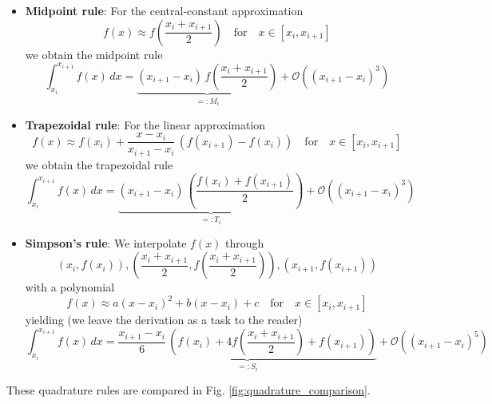 \begin{itemize}
    \item \textbf{Midpoint rule}: For the central-constant approximation
    \begin{equation}
        f(x) \approx f\left( \frac{x_{i} + x_{i+1}}{2} \right) \quad \text{for} \quad x \in [x_i, x_{i+1}]
    \end{equation}
    we obtain the midpoint rule
    \begin{equation}
        \int_{x_i}^{x_{i+1}} f(x) \, dx = \underbrace{(x_{i+1} - x_i) \, f\left( \frac{x_{i} + x_{i+1}}{2} \right)}_{=:M_i} + \mathcal{O}((x_{i+1} - x_i)^3)
    \end{equation}
    \item \textbf{Trapezoidal rule}: For the linear approximation
    \begin{equation}
        f(x) \approx f\left( x_{i} \right) + \frac{x-x_{i}}{x_{i+1}-x_{i}} \, \left( f\left( x_{i+1} \right) - f\left( x_{i} \right) \right) \quad \text{for} \quad x \in [x_i, x_{i+1}]
    \end{equation}
    we obtain the trapezoidal rule
    \begin{equation}
        \int_{x_i}^{x_{i+1}} f(x) \, dx = \underbrace{(x_{i+1} - x_i) \, \left(\frac{f(x_i) + f(x_{i+1})}{2}\right)}_{=:T_i} + \mathcal{O}((x_{i+1} - x_i)^3)
    \end{equation}
    \item \textbf{Simpson's rule}: We interpolate $f(x)$ through
    \begin{equation}
        \left(x_{i}, f(x_{i})\right), \left(\frac{x_{i} + x_{i+1}}{2}, f\left(\frac{x_{i} + x_{i+1}}{2}\right)\right), \left(x_{i+1}, f(x_{i+1})\right)
    \end{equation}
    with a polynomial
    \begin{equation}
        f(x) \approx a(x-x_i)^2 + b(x-x_i) + c \quad \text{for} \quad x \in [x_i, x_{i+1}]
    \end{equation}
    yielding (we leave the derivation as a task to the reader)
    \begin{equation}
        \int_{x_i}^{x_{i+1}} f(x) \, dx = \underbrace{\frac{x_{i+1} - x_i}{6} \, \left(f(x_i) + 4 f\left(\frac{x_i + x_{i+1}}{2}\right) + f(x_{i+1})\right)}_{=:S_i} + \mathcal{O}((x_{i+1}-x_i)^5)
    \end{equation}
\end{itemize}

These quadrature rules are compared in Fig. \ref{fig:quadrature_comparison}.

